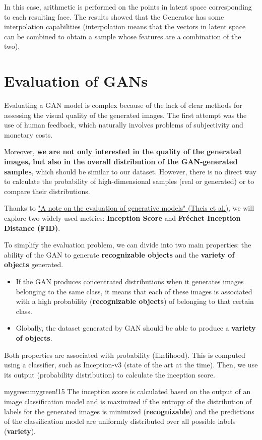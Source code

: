 In this case, arithmetic is performed on the points in latent space corresponding to each resulting face. The results showed that the Generator has some interpolation capabilities (interpolation means that the vectors in latent space can be combined to obtain a sample whose features are a combination of the two).

\section{Evaluation of GANs}

Evaluating a GAN model is complex because of the lack of clear methods for assessing the visual quality of the generated images. The first attempt was the use of human feedback, which naturally involves problems of subjectivity and monetary costs.

Moreover, \textbf{we are not only interested in the quality of the generated images, but also in the overall distribution of the GAN-generated samples}, which should be similar to our dataset. However, there is no direct way to calculate the probability of high-dimensional samples (real or generated) or to compare their distributions.

Thanks to \href{https://arxiv.org/pdf/1511.01844}{"A note on the evaluation of generative models" (Theis et al.)}, we will explore two widely used metrics: \textbf{Inception Score} and \textbf{Fréchet Inception Distance (FID)}.

To simplify the evaluation problem, we can divide into two main properties: the ability of the GAN to generate \textbf{recognizable objects} and the \textbf{variety of objects} generated.
\begin{itemize}
    \item If the GAN produces concentrated distributions when it generates images belonging to the same class, it means that each of these images is associated with a high probability (\textbf{recognizable objects}) of belonging to that certain class.
    \item Globally, the dataset generated by GAN should be able to produce a \textbf{variety of objects}.
\end{itemize}

Both properties are associated with probability (likelihood). This is computed using a classifier, such as Inception-v3 (state of the art at the time). Then, we use its output (probability distribution) to calculate the inception score.

\begin{remark}{mygreen}{mygreen!15}
The inception score is calculated based on the output of an image classification model and is maximized if the entropy of the distribution of labels for the generated images is minimized (\textbf{recognizable}) and the predictions of the classification model are uniformly distributed over all possible labels (\textbf{variety}).
\end{remark}

